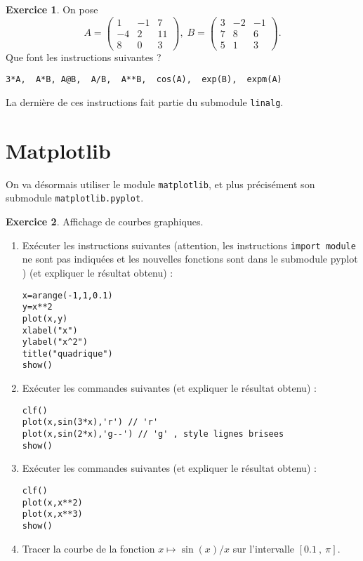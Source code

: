 \documentclass[a4paper,francais,11pt]{article}
\theoremstyle{definition}
\newtheorem{exercice}{Exercice}
\begin{document}
\begin{exercice}
On pose 
\[A=\begin{pmatrix}1 & -1 & 7 \\ -4 & 2 & 11\\ 8 & 0 & 3
\end{pmatrix}
,\;
B=\begin{pmatrix}3 & -2 & -1\\  7 & 8 &  6\\ 5 & 1 & 3
\end{pmatrix}
.\]
Que font les instructions suivantes ?
\begin{verbatim}
3*A,  A*B, A@B,  A/B,  A**B,  cos(A),  exp(B),  expm(A)
\end{verbatim}
La dernière de ces instructions fait partie du submodule {\tt linalg}.
\end{exercice}


\section{Matplotlib}
On va désormais utiliser le module {\tt matplotlib}, et plus précisément son submodule {\tt matplotlib.pyplot}.
\begin{exercice}
Affichage de courbes graphiques. 
\begin{enumerate}
\item Exécuter les instructions suivantes (attention, les instructions {\tt import module} ne sont pas indiquées et les nouvelles fonctions sont dans le submodule pyplot ) (et expliquer le résultat obtenu) :
\begin{verbatim}
x=arange(-1,1,0.1)
y=x**2
plot(x,y)
xlabel("x")
ylabel("x^2")
title("quadrique")
show()
\end{verbatim}
\item Exécuter les commandes suivantes (et expliquer le résultat obtenu)
  :
\begin{verbatim}
clf()
plot(x,sin(3*x),'r') // 'r'
plot(x,sin(2*x),'g--') // 'g' , style lignes brisees
show()
\end{verbatim}
\item Exécuter les commandes suivantes (et expliquer le résultat obtenu)
  :
\begin{verbatim}
clf()
plot(x,x**2)
plot(x,x**3)
show()
\end{verbatim}
\item Tracer la courbe de la fonction $x\mapsto \sin(x)/x$ sur
  l'intervalle $[0.1  \ , \  \pi].$
\end{enumerate}
\end{exercice}
\end{document}
